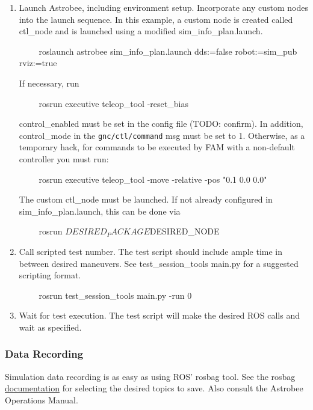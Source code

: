 \documentclass{article}
\begin{document}
\begin{enumerate}
    \item Launch Astrobee, including environment setup. Incorporate any custom nodes into the launch sequence. In this example, a custom node is created called ctl\_node and is launched using a modified sim\_info\_plan.launch.
\begin{markdown}
~~~~
roslaunch astrobee sim_info_plan.launch dds:=false robot:=sim_pub rviz:=true
~~~~
\end{markdown}
    If necessary, run
\begin{markdown}
~~~~
rosrun executive teleop_tool -reset_bias
~~~~
\end{markdown}

control\_enabled must be set in the config file (TODO: confirm). In addition, control\_mode in the \texttt{gnc/ctl/command} msg must be set to 1. Otherwise, as a temporary hack, for commands to be executed by FAM with a non-default controller you must run:
\begin{markdown}
~~~~
rosrun executive teleop_tool -move -relative -pos "0.1 0.0 0.0"
~~~~
\end{markdown}

The custom ctl\_node must be launched. If not already configured in sim\_info\_plan.launch, this can be done via 

\begin{markdown}
~~~~
rosrun $DESIRED_PACKAGE $DESIRED_NODE
~~~~
\end{markdown}

\item Call scripted test number. The test script should include ample time in between desired maneuvers. See test\_session\_tools main.py for a suggested scripting
format.

\begin{markdown}
~~~~
rosrun test_session_tools main.py -run 0
~~~~
\end{markdown}

\item Wait for test execution. The test script will make the desired ROS calls and wait as specified.
\end{enumerate}

\subsubsection{Data Recording}

Simulation data recording is as easy as using ROS' rosbag tool. See the rosbag \href{http://wiki.ros.org/rosbag}{documentation} for selecting the desired topics to save. Also consult the Astrobee Operations Manual.
\end{document}
